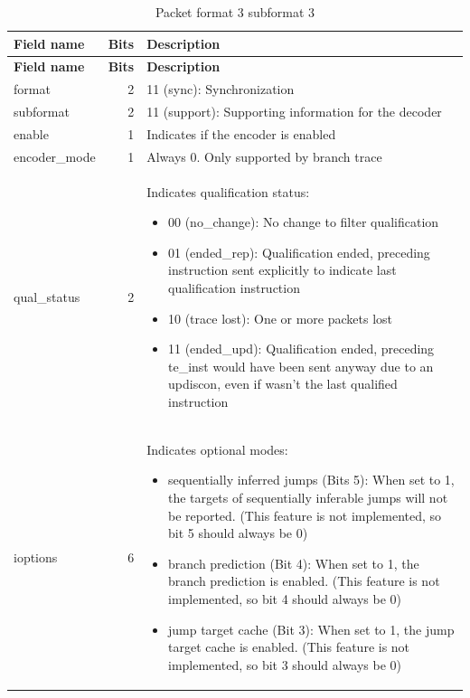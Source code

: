 \documentclass[main\_\_EN.tex]{subfiles}
\begin{document}
\begin{longtable}[c]{ |l|r|L{12.2cm}| }
    \caption{Packet format 3 subformat 3}
    \label{tab:f3s3}
    \\\hline{}
    \textbf{Field name} & \textbf{Bits} & \textbf{Description} \\\hline
    \endfirsthead
    \hline{}
    \textbf{Field name} & \textbf{Bits} & \textbf{Description} \\\hline
    \endhead
    \endfoot
    \endlastfoot

    format & 2 & 11 (sync): Synchronization \\\hline
    subformat & 2 & 11 (support): Supporting information for the decoder \\\hline
    enable & 1 & Indicates if the encoder is enabled \\\hline
    encoder\_mode & 1 & Always 0. Only supported by branch trace \\\hline
    qual\_status & 2 & Indicates qualification status:
    \begin{itemize}
        \item 00 (no\_change): No change to filter qualification
        \item 01 (ended\_rep): Qualification ended, preceding instruction sent explicitly to indicate last qualification instruction
        \item 10 (trace lost): One or more packets lost
        \item 11 (ended\_upd): Qualification ended, preceding te\_inst would have been sent anyway due to an updiscon, even if wasn't the last qualified instruction
        \vspace{-1.5em}
    \end{itemize}
    \\\hline
    ioptions & 6 & Indicates optional modes:
    \begin{itemize}
        \item sequentially inferred jumps (Bits 5): When set to 1, the targets of sequentially inferable jumps will not be reported. (This feature is not implemented, so bit 5 should always be 0)
        \item branch prediction (Bit 4): When set to 1, the branch prediction is enabled. (This feature is not implemented, so bit 4 should always be 0)
        \item jump target cache (Bit 3): When set to 1, the jump target cache is enabled. (This feature is not implemented, so bit 3 should always be 0)

\end{itemize}
\end{longtable}
\end{document}
